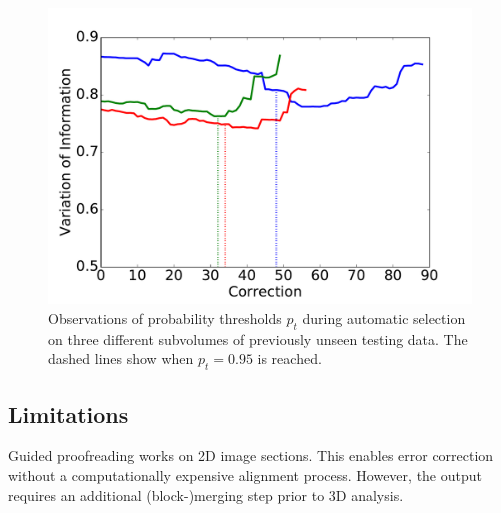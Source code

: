 \begin{figure}[t]
\centering
\includegraphics[width=\linewidth]{gfx/ptplot.pdf}
\caption{Observations of probability thresholds $p_t$ during automatic selection on three different subvolumes of previously unseen testing data. The dashed lines show when $p_t=0.95$ is reached.}
\label{fig:cylboxplot}
\end{figure}

\subsection{Limitations}
Guided proofreading works on 2D image sections. This enables error correction without a computationally expensive alignment process. However, the output requires an additional (block-)merging step prior to 3D  analysis.
